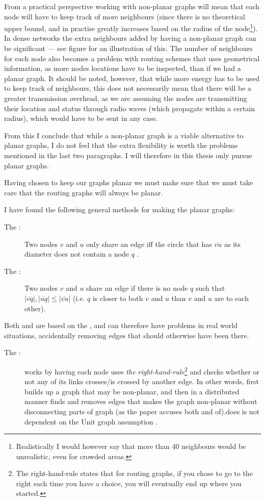 From a practical perspective working with non-planar graphs will mean that each node will have to keep track of more neighbours (since there is no theoretical upper bound, and in practise greatly increases based on the radius of the node\footnote{Realistically I would however say that more than 40 neighbours would be unrealistic, even for crowded areas.}). In dense networks the extra neighbours added by having a non-planar graph can be significant --- see figure  for an illustration of this. The number of neighbours for each node also becomes a problem with routing schemes that uses geometrical information, as more nodes locations have to be inspected, than if we had a planar graph. It should be noted, however, that while more energy has to be used to keep track of neighbours, this does not necessarily mean that there will be a greater transmission overhead, as we are assuming the nodes are transmitting their location and status through radio waves (which propagate within a certain radius), which would have to be sent in any case.

From this I conclude that while a non-planar graph is a viable alternative to planar graphs, I do not feel that the extra flexibility is worth the problems mentioned in the last two paragraphs. I will therefore in this thesis only pursue planar graphs.
 
Having chosen to keep our graphs planar we must make sure that we must take care that the routing graphs will always be planar.

I have found the following general methods for making the planar graphs:
\begin{description}
\item[The \gabe:] Two nodes $v$ and $u$ only share an edge iff the circle that has $\overline{vu}$ as its diameter does not contain a node $q$ \cite{gopher, gpsr}. 
\item[The \rng:] Two nodes $v$ and $u$ share an edge if there is no node $q$ such that $|\overline{vq}|, |\overline{uq}| \leq |\overline{vu}|$ (i.e. $q$ is closer to both $v$ and $u$ than $v$ and $u$ are to each other). \cite{gpsr, RNG}
\end{description}

Both \gabe and \rng are based on the \uga, and can therefore have problems in real world situations, accidentally removing edges that should otherwise have been there\cite{practical}.
\label{right-hand rule}
\begin{description}
\item[The \cldp:] \cldp works by having each node uses \emph{the right-hand-rule}\footnote{The right-hand-rule states that for routing graphs, if you chose to go to the right each time you have a choice, you will eventually end up where you started.} and checks whether or not any of its links crosses/is crossed by another edge. In other words, \cldp first builds up a graph that may be non-planar, and then in a distributed manner finds and removes edges that makes the graph non-planar without disconnecting parts of graph (as the paper accuses both \gabe and \rng of).\cldp does is not dependent on the Unit graph assumption \cite{practical}. 
\end{description}

